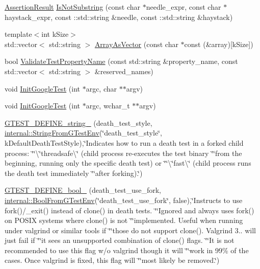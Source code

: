 \begin{DoxyCompactItemize}
\item 
\hyperlink{classtesting_1_1_assertion_result}{Assertion\-Result} \hyperlink{namespacetesting_abe7b3fa1c9528745f934d4a14155ea87}{Is\-Not\-Substring} (const char $\ast$needle\-\_\-expr, const char $\ast$haystack\-\_\-expr, const \-::std\-::string \&needle, const \-::std\-::string \&haystack)
\item 
{\footnotesize template$<$int k\-Size$>$ }\\std\-::vector$<$ std\-::string $>$ \hyperlink{namespacetesting_ab25cc403881367e4ae289dab4eb37f5d}{Array\-As\-Vector} (const char $\ast$const (\&array)\mbox{[}k\-Size\mbox{]})
\item 
bool \hyperlink{namespacetesting_a4c9bd414747bf0563bfdb32a2307dcdf}{Validate\-Test\-Property\-Name} (const std\-::string \&property\-\_\-name, const std\-::vector$<$ std\-::string $>$ \&reserved\-\_\-names)
\item 
void \hyperlink{namespacetesting_afd726ae08c9bd16dc52f78c822d9946b}{Init\-Google\-Test} (int $\ast$argc, char $\ast$$\ast$argv)
\item 
void \hyperlink{namespacetesting_ae5a88709a4a7529e30c83242156556b3}{Init\-Google\-Test} (int $\ast$argc, wchar\-\_\-t $\ast$$\ast$argv)
\item 
\hyperlink{namespacetesting_ad93c9ec89517d047ed323b79d96df251}{G\-T\-E\-S\-T\-\_\-\-D\-E\-F\-I\-N\-E\-\_\-string\-\_\-} (death\-\_\-test\-\_\-style, \hyperlink{namespacetesting_1_1internal_a0967cbf18fb1594f82512d8d822aba21}{internal\-::\-String\-From\-G\-Test\-Env}(\char`\"{}death\-\_\-test\-\_\-style\char`\"{}, k\-Default\-Death\-Test\-Style),\char`\"{}Indicates how to run a death test in a forked child process\-: \char`\"{}\char`\"{}\textbackslash{}\char`\"{}threadsafe\textbackslash{}\char`\"{} (child process re-\/executes the test binary \char`\"{}\char`\"{}from the beginning, running only the specific death test) or \char`\"{}\char`\"{}\textbackslash{}\char`\"{}fast\textbackslash{}\char`\"{} (child process runs the death test immediately \char`\"{}\char`\"{}after forking).\char`\"{})
\item 
\hyperlink{namespacetesting_afee59458b05682d57d3a389e0903bc01}{G\-T\-E\-S\-T\-\_\-\-D\-E\-F\-I\-N\-E\-\_\-bool\-\_\-} (death\-\_\-test\-\_\-use\-\_\-fork, \hyperlink{namespacetesting_1_1internal_a1055088bb9b867e1b7b8f096f519d7c5}{internal\-::\-Bool\-From\-G\-Test\-Env}(\char`\"{}death\-\_\-test\-\_\-use\-\_\-fork\char`\"{}, false),\char`\"{}Instructs to use fork()/\-\_\-exit() instead of clone() in death tests. \char`\"{}\char`\"{}Ignored and always uses fork() on P\-O\-S\-I\-X systems where clone() is not \char`\"{}\char`\"{}implemented. Useful when running under valgrind or similar tools if \char`\"{}\char`\"{}those do not support clone(). Valgrind 3.. will just fail if \char`\"{}\char`\"{}it sees an unsupported combination of clone() flags. \char`\"{}\char`\"{}It is not recommended to use this flag w/o valgrind though it will \char`\"{}\char`\"{}work in 99\% of the cases. Once valgrind is fixed, this flag will \char`\"{}\char`\"{}most likely be removed.\char`\"{})

\end{DoxyCompactItemize}
